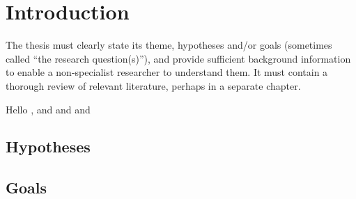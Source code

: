 \chapter{Introduction}
\label{introduction}

The thesis must clearly state its theme, hypotheses and/or goals (sometimes called “the research question(s)”), and provide sufficient background information to enable a non-specialist researcher to understand them. It must contain a thorough review of relevant literature, perhaps in a separate chapter.

Hello \citep{DUMMY:1}, and \citep{article:visual} and \citep{article:laser} and \citep{article:motorsignals}

\section{Hypotheses}

\section{Goals}